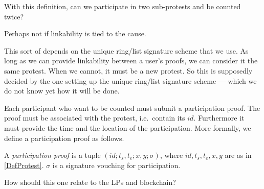 \begin{frame}
\begin{question}
  With this definition, can we participate in two sub-protests and be counted 
  twice?
\end{question}
\begin{remark}
  Perhaps not if linkability is tied to the cause.
\end{remark}
\end{frame}
\begin{remark}
  This sort of depends on the unique ring/list signature scheme that we use.
  As long as we can provide linkability between a user's proofs, we can consider 
  it the same protest.
  When we cannot, it must be a new protest.
  So this is supposedly decided by the one setting up the unique ring/list 
  signature scheme --- which we do not know yet how it will be done.
\end{remark}

Each participant who want to be counted must submit a participation proof.
The proof must be associated with the protest, i.e.\ contain its \(id\).
Furthermore it must provide the time and the location of the participation.
More formally, we define a participation proof as follows.

\begin{definition}
  A \emph{participation proof} is a tuple \((id; t_s, t_e; x, y; \sigma)\), 
  where
  \(id, t_s, t_e, x, y\) are as in \cref{DefProtest}.
  \(\sigma\) is a signature vouching for participation.
\end{definition}

\begin{frame}
\begin{question}
  How should this one relate to the \acp{LP} and blockchain?
\end{question}
\end{frame}



